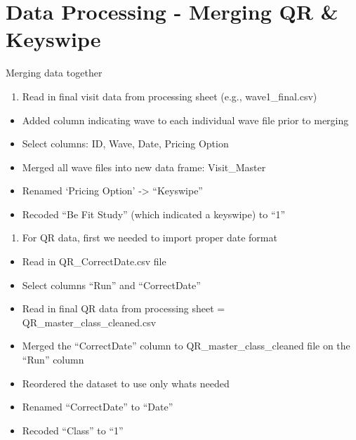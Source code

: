 \documentclass[
]{book}
\providecommand{\tightlist}{%
  \setlength{\itemsep}{0pt}\setlength{\parskip}{0pt}}
\begin{document}
\hypertarget{data-processing---merging-qr-keyswipe}{%
\chapter{Data Processing - Merging QR \& Keyswipe}\label{data-processing---merging-qr-keyswipe}}

Merging data together

\begin{enumerate}
\def\labelenumi{\alph{enumi}.}
\tightlist
\item
  Read in final visit data from processing sheet (e.g., wave1\_final.csv)
\end{enumerate}

\begin{itemize}
\tightlist
\item
  Added column indicating wave to each individual wave file prior to merging
\item
  Select columns: ID, Wave, Date, Pricing Option
\item
  Merged all wave files into new data frame: Visit\_Master
\item
  Renamed `Pricing Option' -\textgreater{} ``Keyswipe''
\item
  Recoded ``Be Fit Study'' (which indicated a keyswipe) to ``1''
\end{itemize}

\begin{enumerate}
\def\labelenumi{\alph{enumi}.}
\setcounter{enumi}{1}
\tightlist
\item
  For QR data, first we needed to import proper date format
\end{enumerate}

\begin{itemize}
\tightlist
\item
  Read in QR\_CorrectDate.csv file
\item
  Select columns ``Run'' and ``CorrectDate''
\item
  Read in final QR data from processing sheet = QR\_master\_class\_cleaned.csv
\item
  Merged the ``CorrectDate'' column to QR\_master\_class\_cleaned file on the ``Run'' column
\item
  Reordered the dataset to use only whats needed
\item
  Renamed ``CorrectDate'' to ``Date''
\item
  Recoded ``Class'' to ``1''
\end{itemize}
\end{document}
